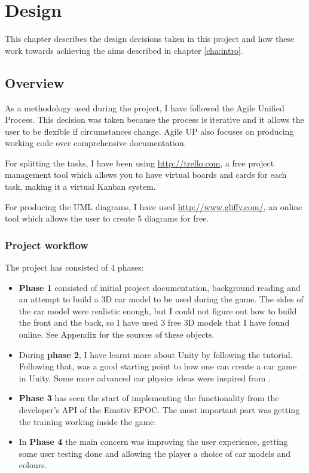 \chapter{Design}
\label{cha:design}

This chapter describes the design decisions taken in this project and how these work towards achieving the aims described in chapter \ref{cha:intro}.

\section{Overview}
As a methodology used during the project, I have followed the Agile Unified Process. This decision was taken because the process is iterative and it allows the user to be flexible if circumstances change. Agile UP also focuses on producing working code over comprehensive documentation.

For splitting the tasks, I have been using \url{http://trello.com}, a free project management tool which allows you to have virtual boards and cards for each task, making it a virtual Kanban system.

For producing the UML diagrams, I have used \url{http://www.gliffy.com/}, an online tool which allows the user to create 5 diagrams for free.

\subsection{Project workflow}
The project has consisted of 4 phases:
\begin{itemize}
	\item \textbf{Phase 1} consisted of initial project documentation, background reading and an attempt to build a 3D car model to be used during the game. The sides of the car model were realistic enough, but I could not figure out how to build the front and the back, so I have used 3 free 3D models that I have found online. See Appendix for the sources of these objects.
	\item During \textbf{phase 2}, I have learnt more about Unity by following the \cite{walkerboys} tutorial. Following that, \cite{flattutorials} was a good starting point to how one can create a car game in Unity. Some more advanced car physics ideas were inspired from \cite{carphysics}.
	\item \textbf{Phase 3} has seen the start of implementing the functionality from the developer's API of the Emotiv EPOC. The most important part was getting the training working inside the game.
	\item In \textbf{Phase 4} the main concern was improving the user experience, getting some user testing done and allowing the player a choice of car models and colours.
\end{itemize}


